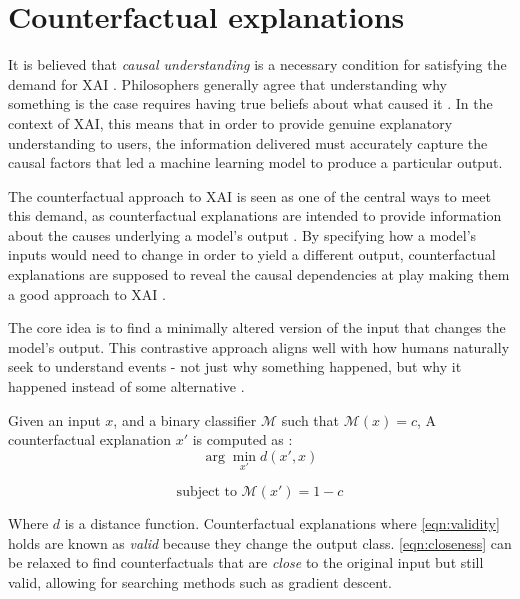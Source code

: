 \section{Counterfactual explanations}
It is believed that \textit{causal understanding} is a necessary condition for satisfying the demand for XAI \cite{chou_counterfactuals_2022}. Philosophers generally agree that understanding why something is the case requires having true beliefs about what caused it \cite{baron_explainable_2023}. In the context of XAI, this means that in order to provide genuine explanatory understanding to users, the information delivered must accurately capture the causal factors that led a machine learning model to produce a particular output.
 
The counterfactual approach to XAI is seen as one of the central ways to meet this demand, as counterfactual explanations are intended to provide information about the causes underlying a model's output \cite{buijsman_defining_2022, miller_explanation_2019}. By specifying how a model's inputs would need to change in order to yield a different output, counterfactual explanations are supposed to reveal the causal dependencies at play making them a good approach to XAI \cite{baron_explainable_2023}.

The core idea is to find a minimally altered version of the input that changes the model's output. This contrastive approach aligns well with how humans naturally seek to understand events - not just why something happened, but why it happened instead of some alternative \cite{wachter_counterfactual_2017, celar_how_2023}.

Given an input $x$, and a binary classifier $\mathcal{M}$ such that $\mathcal{M}(x)=c$, A counterfactual explanation $x'$ is computed as \cite{karimi_survey_2023}:
\begin{equation}
   \arg \min_{x'} d(x',x)
    \label{eqn:closeness}
\end{equation}

\begin{equation}
    \text{subject to } \mathcal{M}(x') = 1-c
    \label{eqn:validity}
\end{equation}

Where $d$ is a distance function. Counterfactual explanations where \ref{eqn:validity} holds are known as \emph{valid} because they change the output class. \ref{eqn:closeness} can be relaxed to find counterfactuals that are \emph{close} to the original input but still valid, allowing for searching methods such as gradient descent.
 
